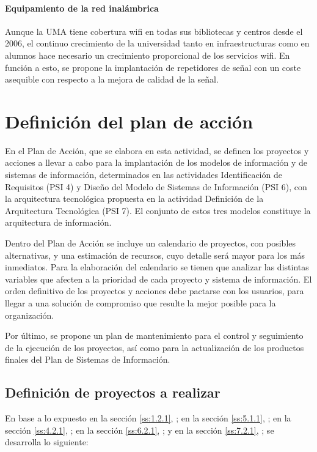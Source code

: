 \documentclass[11pt,a4paper,spanish,twoside]{book}
\begin{document}
\subsubsection{Equipamiento de la red inalámbrica}
Aunque la UMA tiene cobertura wifi en todas sus bibliotecas y centros desde
el 2006, el continuo crecimiento de la universidad tanto en infraestructuras
como en alumnos hace necesario un crecimiento proporcional de los servicios
wifi. En función a esto, se propone la implantación de repetidores de señal
con un coste asequible con respecto a la mejora de calidad de la señal.


\chapter{Definición del plan de acción}
En el Plan de Acción, que se elabora en esta actividad, se definen los
proyectos y acciones a llevar a cabo para la implantación de los modelos de
información y de sistemas de información, determinados en las actividades
Identificación de Requisitos (PSI 4) y Diseño del Modelo de Sistemas de
Información (PSI 6), con la arquitectura tecnológica propuesta en la
actividad Definición de la Arquitectura Tecnológica (PSI 7). El conjunto de
estos tres modelos constituye la arquitectura de información. 

Dentro del Plan de Acción se incluye un calendario de proyectos, con posibles 
alternativas, y una estimación de recursos, cuyo detalle será mayor para los 
más inmediatos. Para la elaboración del calendario se tienen que analizar las
distintas variables que afecten a la prioridad de cada proyecto y sistema de
información. El orden definitivo de los proyectos y acciones debe pactarse
con los usuarios, para llegar a una solución de compromiso que resulte la
mejor posible para la organización. 

Por último, se propone un plan de mantenimiento para el control y seguimiento 
de la ejecución de los proyectos, así como para la actualización de los 
productos finales del Plan de Sistemas de Información. 

\section{Definición de proyectos a realizar}
En base a lo expuesto 
en la sección \vref{ss:1.2.1}, \emph{}; 
en la sección \vref{ss:5.1.1}, \emph{}; 
en la sección \vref{ss:4.2.1}, \emph{}; 
en la sección \vref{ss:6.2.1}, \emph{}; y
en la sección \vref{ss:7.2.1}, \emph{}; 
se desarrolla lo siguiente:
\end{document}
